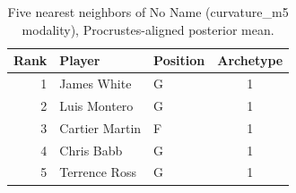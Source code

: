 \begin{table}[htbp]
  \centering\small
  \begin{tabular}{rllc}
    \toprule
    Rank & Player & Position & Archetype \\
    \midrule
    1 & James White & G & 1 \\
    2 & Luis Montero & G & 1 \\
    3 & Cartier Martin & F & 1 \\
    4 & Chris Babb & G & 1 \\
    5 & Terrence Ross & G & 1 \\
    \bottomrule
  \end{tabular}
  \caption{Five nearest neighbors of No Name (curvature_m5 modality), Procrustes-aligned posterior mean.}
  \label{tab:No_Name_neighbors_curvature_m5}
\end{table}

